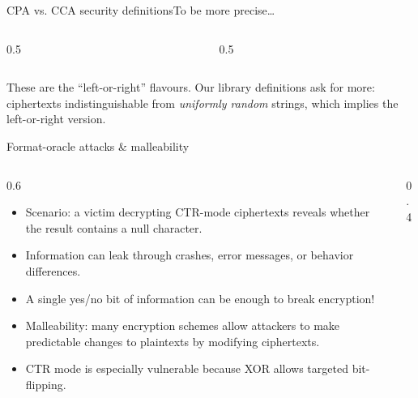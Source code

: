 \ifdefined\PRESENTATION\else\PassOptionsToClass{handout}{beamer}\fi\documentclass[aspectratio=169, lualatex]{beamer}
\begin{document}
\begin{frame}{CPA vs. CCA security definitions}{To be more precise\ldots}
	\begin{columns}[c]
		\begin{column}{0.5\textwidth}
		\end{column}
		\begin{column}{0.5\textwidth}
		\end{column}
	\end{columns}
	\vspace{0.6em}
	\begin{center}
		{\small These are the ``left-or-right'' flavours. Our library definitions ask for more: ciphertexts indistinguishable from \emph{uniformly random} strings, which implies the left-or-right version.}
	\end{center}
\end{frame}

\begin{frame}{Format-oracle attacks \& malleability}
	\begin{columns}[c]
		\begin{column}{0.6\textwidth}
			\begin{itemize}[<+->]
				\item Scenario: a victim decrypting CTR-mode ciphertexts reveals whether the result contains a null character.
				\item Information can leak through crashes, error messages, or behavior differences.
				\item A single yes/no bit of information can be enough to break encryption!
				\item Malleability: many encryption schemes allow attackers to make predictable changes to plaintexts by modifying ciphertexts.
				\item CTR mode is especially vulnerable because XOR allows targeted bit-flipping.
			\end{itemize}
		\end{column}
		\begin{column}{0.4\textwidth}
		\end{column}
	\end{columns}
\end{frame}
\end{document}
